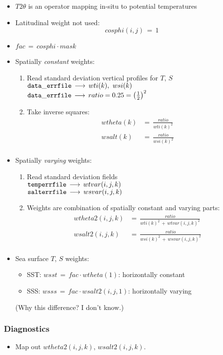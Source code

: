 \begin{itemize}
%
\item
$T2\theta$ is an operator mapping in-situ to potential temperatures
%
\item
Latitudinal weight not used:
\[
cosphi(i,j) \, = \, 1
\]
%
\item
$ fac \, = \, cosphi \cdot mask $
%
\item
Spatially {\it constant} weights:
%
\begin{enumerate}
%
\item
Read standard deviation vertical profiles for $T$, $S$ \\
$ {\tt data\_errfile} \, \longrightarrow \, 
wti(k), \,\, wsi(k) $ \\
$ {\tt data\_errfile} \, \longrightarrow \, 
ratio = 0.25 = \left( \frac{1}{2} \right)^2 $
%
\item
Take inverse squares:
\[
\begin{split}
wtheta(k) & = \, \frac{ratio}{wti(k)^2} \\
wsalt(k) & = \, \frac{ratio}{wsi(k)^2} \\
\end{split}
\]
%
\end{enumerate}
%
\item
Spatially {\it varying} weights:
%
\begin{enumerate}
%
\item
Read standard deviation fields \\
$ {\tt temperrfile} \, \longrightarrow \, wtvar(i,j,k) $ \\
$ {\tt salterrfile} \, \longrightarrow \, wsvar(i,j,k) $ \\
%
\item
Weights are combination of spatially constant and varying parts:
\[
\begin{split}
wtheta2(i,j,k) & = \, \frac{ratio}
{wti(k)^2 \, + \,wtvar(i,j,k)^2 } \\
wsalt2(i,j,k) & = \, 
\frac{ratio}
{wsi(k)^2 \, + \,wsvar(i,j,k)^2 } \\
\end{split}
\]
%
\end{enumerate}
%
\item
Sea surface $T$, $S$ weights:
\begin{itemize}
\item
SST: $ wsst \, = \, fac \cdot wtheta(1)$: horizontally constant
\item
SSS: $ wsss \, = \, fac \cdot wsalt2(i,j,1)$: horizontally varying
\end{itemize}
(Why this difference? I don't know.)
%
\end{itemize}


\subsubsection{Diagnostics}

\begin{itemize}
%
\item
Map out $wtheta2(i,j,k)$, $wsalt2(i,j,k)$.

%
\end{itemize}

